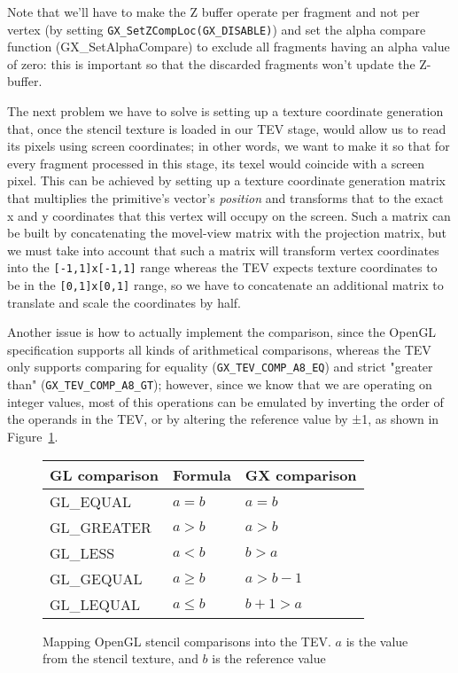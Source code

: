 \documentclass[12pt]{article}
\newcommand{\fname}[1] {{\color{blue}#1}}
\begin{document}
Note that we'll have to make the Z buffer operate per fragment and not per vertex (by setting \lstinline{GX_SetZCompLoc(GX_DISABLE)}) and set the alpha compare function (\fname{GX_SetAlphaCompare}) to exclude all fragments having an alpha value of zero: this is important so that the discarded fragments won't update the Z-buffer.

The next problem we have to solve is setting up a texture coordinate generation that, once the stencil texture is loaded in our TEV stage, would allow us to read its pixels using screen coordinates; in other words, we want to make it so that for every fragment processed in this stage, its texel would coincide with a screen pixel. This can be achieved by setting up a texture coordinate generation matrix that multiplies the primitive's vector's \emph{position} and transforms that to the exact x and y coordinates that this vertex will occupy on the screen. Such a matrix can be built by concatenating the movel-view matrix with the projection matrix, but we must take into account that such a matrix will transform vertex coordinates into the \lstinline{[-1,1]x[-1,1]} range whereas the TEV expects texture coordinates to be in the \lstinline{[0,1]x[0,1]} range, so we have to concatenate an additional matrix to translate and scale the coordinates by half.

Another issue is how to actually implement the comparison, since the OpenGL specification supports all kinds of arithmetical comparisons, whereas the TEV only supports comparing for equality (\lstinline{GX_TEV_COMP_A8_EQ}) and strict "greater than" (\lstinline{GX_TEV_COMP_A8_GT}); however, since we know that we are operating on integer values, most of this operations can be emulated by inverting the order of the operands in the TEV, or by altering the reference value by ±1, as shown in Figure~\ref{table:stencil1}.

\begin{figure}[ht]
\centering

\begin{tabular}{|l|l|l|}
\hline
    {GL comparison} & {Formula} & {GX comparison} \\
\hline
    GL\_EQUAL & $a = b$ & $a = b$ \\
\hline
	GL\_GREATER & $a > b$ & $a > b$\\
\hline
	GL\_LESS & $a < b$ & $b > a$\\
\hline
	GL\_GEQUAL & $a \geq b$ & $a > b - 1$ \\
\hline
	GL\_LEQUAL & $a \leq b$ & $b + 1 > a$ \\
\hline
\end{tabular}
\caption{Mapping OpenGL stencil comparisons into the TEV. $a$ is the value from the stencil texture, and $b$ is the reference value}
\label{table:stencil1}
\end {figure}
\end{document}
